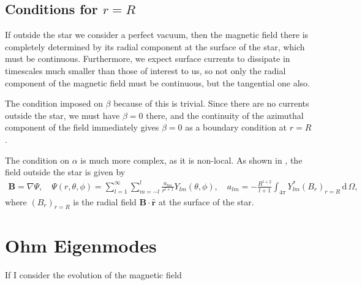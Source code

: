 \documentclass[letterpaper,10pt]{article}
\newcommand{\dd}{\,\mathrm{d}\,}
\renewcommand{\vec}[1]{\boldsymbol#1}
\newcommand{\bhat}[1]{\hat{\boldsymbol#1}}
\begin{document}
\subsection{Conditions for $r=R$}
If outside the star we consider a perfect vacuum, then the magnetic field there is completely determined by its radial component at the surface of the star, which must be continuous. Furthermore, we expect surface currents to dissipate in timescales much smaller than those of interest to us, so not only the radial component of the magnetic field must be continuous, but the tangential one also.

The condition imposed on $\beta$ because of this is trivial. Since there are no currents outside the star, we must have $\beta=0$ there, and the continuity of the azimuthal component of the field immediately gives $\beta=0$ as a boundary condition at $r=R$.

The condition on $\alpha$ is much more complex, as it is non-local. As shown in \citet{mar+11}, the field outside the star is given by
\begin{eqnarray}
\vec{B}=\nabla\Psi,\quad \Psi(r,\theta,\phi)=\sum_{l=1}^{\infty}\sum_{m=-l}^{l}\frac{a_{lm}}{r^{l+1}}Y_{lm}(\theta,\phi),\quad a_{lm}=-\frac{R^{l+2}}{l+1}\int_{4\pi}Y_{lm}^*(B_r)_{r=R}\dd\Omega,
\end{eqnarray}
where $(B_r)_{r=R}$ is the radial field $\vec{B}\cdot\bhat{r}$ at the surface of the star.
\section{Ohm Eigenmodes}
If I consider the evolution of the magnetic field


\end{document}
